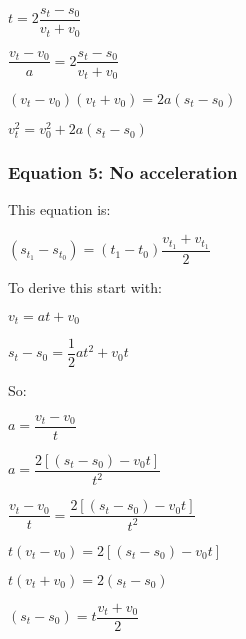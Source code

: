 \(t=2\dfrac{s_t-s_0}{v_t+v_0}\)

\(\dfrac{v_t-v_0}{a}=2\dfrac{s_t-s_0}{v_t+v_0}\)

\((v_t-v_0)(v_t+v_0)=2a(s_t-s_0)\)

\(v^2_t= v^2_0+2a(s_t-s_0)\)
\subsubsection{Equation 5: No acceleration}

This equation is:

\((s_{t_1}-s_{t_0})=(t_1-t_0)\dfrac{v_{t_1}+v_{t_1}}{2}\)

To derive this start with:

\(v_t=at+v_0\)

\(s_t-s_0=\dfrac{1}{2}at^2+v_0t\)

So:

\(a=\dfrac{v_t-v_0}{t}\)

\(a=\dfrac{2[(s_t-s_0)-v_0t]}{t^2}\)

\(\dfrac{v_t-v_0}{t}=\dfrac{2[(s_t-s_0)-v_0t]}{t^2}\)

\(t(v_t-v_0)=2[(s_t-s_0)-v_0t]\)

\(t(v_t+v_0)=2(s_t-s_0)\)

\((s_t-s_0)=t\dfrac{v_t+v_0}{2}\)

